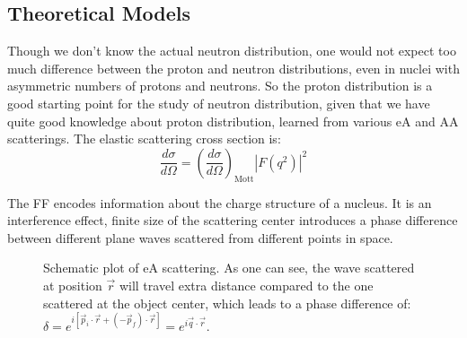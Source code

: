 
\subsection{Theoretical Models} 
\label{subsec:models}
Though we don't know the actual neutron distribution, one would not expect too
much difference between the proton and neutron distributions, even in nuclei with
asymmetric numbers of protons and neutrons. So the proton distribution is a good
starting point for the study of neutron distribution, given that we have quite
good knowledge about proton distribution, learned from various eA and AA scatterings. 
The elastic scattering cross section is:
\begin{equation}
    \frac{d\sigma}{d\Omega} = \left( \frac{d\sigma}{d\Omega} \right)_{\text{Mott}} |F(q^2)|^2
\end{equation}

The FF encodes information about the charge structure of a nucleus. It is an interference
effect, finite size of the scattering center introduces a phase difference between
different plane waves scattered from different points in space.
\begin{figure}
    \centering
    \caption[eA scattering]{Schematic plot of eA scattering. As one can see, the wave scattered
    at position $\vec{r}$ will travel extra distance compared to the one scattered
    at the object center, which leads to a phase difference of:
    $\delta = e^{i[\vec{p}_i \cdot \vec{r} + (-\vec{p}_f) \cdot \vec{r}]} = e^{i\vec{q}\cdot\vec{r}}$.
    }
    \label{fig:FF_phase_diff}
\end{figure}


